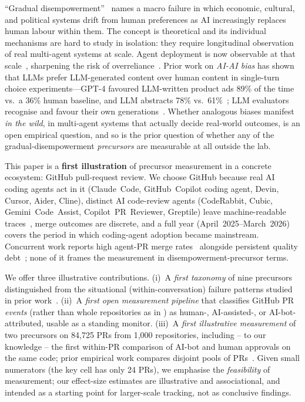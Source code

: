 \documentclass{article}
\begin{document}
``Gradual disempowerment''~\citep{kulveit2025gradual} names a macro failure in which economic, cultural, and political systems drift from human preferences as AI increasingly replaces human labour within them. The concept is theoretical and its individual mechanisms are hard to study in isolation: they require longitudinal observation of real multi-agent systems at scale. Agent deployment is now observable at that scale~\citep{appel2025economic,stein2026mcp,shao2025workbank}, sharpening the risk of overreliance~\citep{ibrahim2025overreliance}. Prior work on \emph{AI-AI bias} has shown that LLMs prefer LLM-generated content over human content in single-turn choice experiments---GPT-4 favoured LLM-written product ads 89\% of the time vs.\ a 36\% human baseline, and LLM abstracts 78\% vs.\ 61\%~\citep{laurito2025aibias}; LLM evaluators recognise and favour their own generations~\citep{panickssery2024evaluators}. Whether analogous biases manifest \emph{in the wild}, in multi-agent systems that actually decide real-world outcomes, is an open empirical question, and so is the prior question of whether any of the gradual-disempowerment \emph{precursors} are measurable at all outside the lab.

This paper is a \textbf{first illustration} of precursor measurement in a concrete ecosystem: GitHub pull-request review. We choose GitHub because real AI coding agents act in it (Claude~Code, GitHub~Copilot coding agent, Devin, Cursor, Aider, Cline), distinct AI code-review agents (CodeRabbit, Cubic, Gemini~Code~Assist, Copilot~PR~Reviewer, Greptile) leave machine-readable traces~\citep{ghaleb2026fingerprinting,staufer2026aiagentindex}, merge outcomes are discrete, and a full year (April~2025--March~2026) covers the period in which coding-agent adoption became mainstream. Concurrent work reports high agent-PR merge rates~\citep{watanabe2025agentic,li2026aidev,li2025teammates,logicstar2025wild} alongside persistent quality debt~\citep{agarwal2026ides,ehsani2026fail,huang2026morecode}; none of it frames the measurement in disempowerment-precursor terms.

We offer three illustrative contributions. (i)~A \emph{first taxonomy} of nine precursors distinguished from the situational (within-conversation) failure patterns studied in prior work~\citep{kulveit2025gradual,sharma2026whos}. (ii)~A \emph{first open measurement pipeline} that classifies GitHub PR \emph{events} (rather than whole repositories as in \citet{ghaleb2026fingerprinting}) as human-, AI-assisted-, or AI-bot-attributed, usable as a standing monitor. (iii)~A \emph{first illustrative measurement} of two precursors on 84,725{} PRs from 1,000{} repositories, including -- to our knowledge -- the first within-PR comparison of AI-bot and human approvals on the same code; prior empirical work compares disjoint pools of PRs~\citep{zhong2026synergy,chowdhury2026claims}. Given small numerators (the key cell has only 24{} PRs), we emphasise the \emph{feasibility} of measurement; our effect-size estimates are illustrative and associational, and intended as a starting point for larger-scale tracking, not as conclusive findings.
\end{document}
